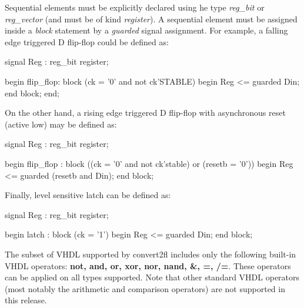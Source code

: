 Sequential elements must be explicitly declared using he type
{\em reg\_bit} or {\em reg\_vector} (and must be of kind {\em register}).
A sequential element must be assigned inside a {\em block} statement
by a {\em guarded} signal assignment.
For example, a falling edge triggered D flip-flop could be defined as:
\begin{hol}
signal Reg : reg\_bit register;

begin
    flip\_flop: block (ck = '0' and not ck'STABLE)
    begin
        Reg <= guarded Din;
    end block;
end;
\end{hol}
On the other hand, a rising edge triggered D flip-flop with asynchronous
reset (active low) may be defined as:
\begin{hol}

signal Reg : reg\_bit register;

begin
    flip\_flop : block ((ck = '0' and not ck'stable) or (resetb = '0'))
    begin
        Reg <= guarded (resetb and Din);
    end block;
\end{hol}

Finally, level sensitive latch can be defined as:
\begin{hol}

signal Reg : reg\_bit register;

begin
    latch : block (ck = '1')
    begin
        Reg <= guarded Din;
    end block;
\end{hol}

The subset of VHDL supported by convert2fl includes only the following
built-in VHDL operators: {\bf not, and, or, xor, nor, nand, \&, =, /=}.
These operators can be applied on all types supported.
Note that other standard VHDL operators (most notably the arithmetic
and comparison operators) are not supported in this release.
